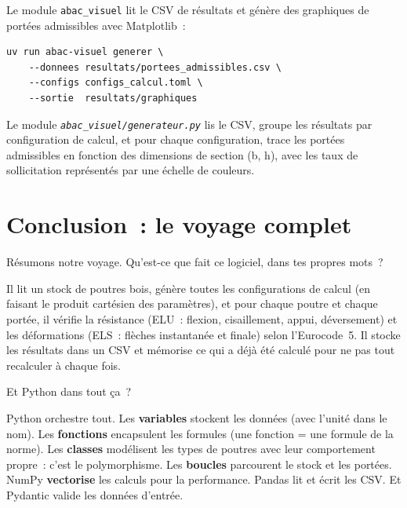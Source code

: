 \documentclass[12pt, a4paper, openany]{book}
\newcommand{\py}[1]{\texttt{#1}}
\newcommand{\fichier}[1]{\texttt{\textit{#1}}}
\begin{document}
Le module \py{abac\_visuel} lit le CSV de r\'esultats et g\'en\`ere
des graphiques de port\'ees admissibles avec Matplotlib~:

\begin{lstlisting}[style=toml, language={}, caption={Lancement de la génération graphique}]
uv run abac-visuel generer \
    --donnees resultats/portees_admissibles.csv \
    --configs configs_calcul.toml \
    --sortie  resultats/graphiques
\end{lstlisting}

Le module \fichier{abac\_visuel/generateur.py} lis le CSV,
groupe les r\'esultats par configuration de calcul,
et pour chaque configuration, trace les port\'ees admissibles
en fonction des dimensions de section (b, h), avec les taux de
sollicitation repr\'esent\'es par une \'echelle de couleurs.

\chapter*{Conclusion~: le voyage complet}

\begin{maitre}
R\'esumons notre voyage. Qu'est-ce que fait ce logiciel,
dans tes propres mots~?
\end{maitre}

\begin{apprenti}
Il lit un stock de poutres bois, g\'en\`ere toutes les configurations
de calcul (en faisant le produit cart\'esien des param\`etres),
et pour chaque poutre et chaque port\'ee, il v\'erifie la r\'esistance
(ELU~: flexion, cisaillement, appui, d\'eversement) et les d\'eformations
(ELS~: fl\`eches instantan\'ee et finale) selon l'Eurocode~5.
Il stocke les r\'esultats dans un CSV et m\'emorise ce qui a d\'ej\`a
\'et\'e calcul\'e pour ne pas tout recalculer \`a chaque fois.
\end{apprenti}

\begin{maitre}
Et Python dans tout \c{c}a~?
\end{maitre}

\begin{apprenti}
Python orchestre tout. Les \textbf{variables} stockent les donn\'ees
(avec l'unit\'e dans le nom). Les \textbf{fonctions} encapsulent les formules
(une fonction = une formule de la norme). Les \textbf{classes} mod\'elisent
les types de poutres avec leur comportement propre~: c'est le polymorphisme.
Les \textbf{boucles} parcourent le stock et les port\'ees. NumPy
\textbf{vectorise} les calculs pour la performance. Pandas lit et \'ecrit
les CSV. Et Pydantic valide les donn\'ees d'entr\'ee.
\end{apprenti}
\end{document}
